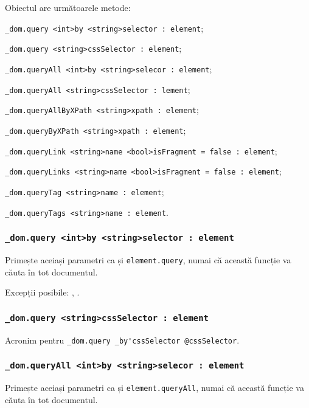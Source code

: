 Obiectul \dom{} are următoarele metode:
\begin{icItems}
	\item \lstinline|_dom.query <int>by <string>selector : element|;
	\item \lstinline|_dom.query <string>cssSelector : element|;
	\item \lstinline|_dom.queryAll <int>by <string>selecor : element|;
	\item \lstinline|_dom.queryAll <string>cssSelector : lement|;
	\item \lstinline|_dom.queryAllByXPath <string>xpath : element|;
	\item \lstinline|_dom.queryByXPath <string>xpath : element|;
	\item \lstinline|_dom.queryLink <string>name <bool>isFragment = false : element|;
	\item \lstinline|_dom.queryLinks <string>name <bool>isFragment = false : element|;
	\item \lstinline|_dom.queryTag <string>name : element|;
	\item \lstinline|_dom.queryTags <string>name : element|.
\end{icItems}

\subsubsection{\lstinline|_dom.query <int>by <string>selector : element|}

Primește aceiași parametri ca și  \lstinline|element.query|, numai că această funcție va căuta în tot documentul.

Excepții posibile: , .

\subsubsection{\lstinline|_dom.query <string>cssSelector : element|}

Acronim pentru \lstinline|_dom.query _by'cssSelector @cssSelector|.

\subsubsection{\lstinline|_dom.queryAll <int>by <string>selecor : element|}

Primește aceiași parametri ca și \lstinline|element.queryAll|, numai că această funcție va căuta în tot documentul.

